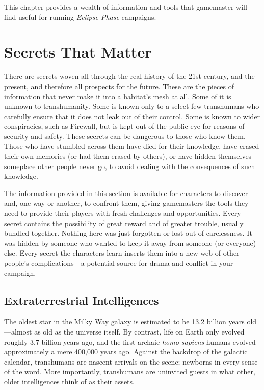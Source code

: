 This chapter provides a wealth of information and 
tools that gamemaster will find useful for running 
\textit{Eclipse Phase} campaigns.

\section{Secrets That Matter}

There are secrets woven all through the real history of 
the 21st century, and the present, and therefore all prospects
for the future. These are the pieces of information
that never make it into a habitat's mesh at all. Some of 
it is unknown to transhumanity. Some is known only 
to a select few transhumans who carefully ensure that 
it does not leak out of their control. Some is known to 
wider conspiracies, such as Firewall, but is kept out of 
the public eye for reasons of security and safety. These 
secrets can be dangerous to those who know them. 
Those who have stumbled across them have died for 
their knowledge, have erased their own memories (or 
had them erased by others), or have hidden themselves 
someplace other people never go, to avoid dealing with 
the consequences of such knowledge.

The information provided in this section is available 
for characters to discover and, one way or another, 
to confront them, giving gamemasters the tools they 
need to provide their players with fresh challenges and 
opportunities. Every secret contains the possibility of 
great reward and of greater trouble, usually bundled 
together. Nothing here was just forgotten or lost out 
of carelessness. It was hidden by someone who wanted 
to keep it away from someone (or everyone) else. 
Every secret the characters learn inserts them into a 
new web of other people's complications—a potential 
source for drama and conflict in your campaign.

\subsection{Extraterrestrial Intelligences}

The oldest star in the Milky Way galaxy is estimated 
to be 13.2 billion years old—almost as old as the 
universe itself. By contrast, life on Earth only evolved 
roughly 3.7 billion years ago, and the first  archaic 
\textit{homo sapiens} humans evolved approximately a mere 
400,000 years ago. Against the backdrop of the galactic
calendar, transhumans are nascent arrivals on
the scene; newborns in every sense of the word. More 
importantly, transhumans are uninvited guests in what 
other, older intelligences think of as their assets.

